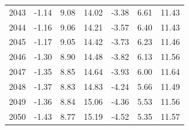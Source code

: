 \begin{table}
\begin{tabular}{lrrrrrr}
2043 & -1.14 & 9.08 & 14.02 & -3.38 & 6.61 & 11.43 \\
2044 & -1.16 & 9.06 & 14.21 & -3.57 & 6.40 & 11.43 \\
2045 & -1.17 & 9.05 & 14.42 & -3.73 & 6.23 & 11.46 \\
2046 & -1.30 & 8.90 & 14.48 & -3.82 & 6.13 & 11.56 \\
2047 & -1.35 & 8.85 & 14.64 & -3.93 & 6.00 & 11.64 \\
2048 & -1.37 & 8.83 & 14.83 & -4.24 & 5.66 & 11.49 \\
2049 & -1.36 & 8.84 & 15.06 & -4.36 & 5.53 & 11.56 \\
2050 & -1.43 & 8.77 & 15.19 & -4.52 & 5.35 & 11.57 \\
\bottomrule
\end{tabular}
\end{table}
